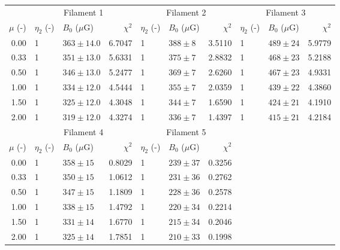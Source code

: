 \begin{tabular}{@{}rllr llr llr@{}}

\toprule
{} & \multicolumn{3}{c}{Filament 1}
   & \multicolumn{3}{c}{Filament 2}
   & \multicolumn{3}{c}{Filament 3} \\
\cmidrule(lr){2-4} \cmidrule(lr){5-7} \cmidrule(lr){8-10}
$\mu$ (-) & $\eta_2$ (-) & $B_0$ ($\mu$G) & $\chi^2$
          & $\eta_2$ (-) & $B_0$ ($\mu$G) & $\chi^2$
          & $\eta_2$ (-) & $B_0$ ($\mu$G) & $\chi^2$ \\

\midrule
0.00 & 1 & $363 \pm 14.0$ & 6.7047
     & 1 & $388 \pm 8$ & 3.5110
     & 1 & $489 \pm 24$ & 5.9779\\
0.33 & 1 & $351 \pm 13.0$ & 5.6331
     & 1 & $375 \pm 7$ & 2.8832
     & 1 & $468 \pm 23$ & 5.2188\\
0.50 & 1 & $346 \pm 13.0$ & 5.2477
     & 1 & $369 \pm 7$ & 2.6260
     & 1 & $467 \pm 23$ & 4.9331\\
1.00 & 1 & $334 \pm 12.0$ & 4.5444
     & 1 & $355 \pm 7$ & 2.0359
     & 1 & $439 \pm 22$ & 4.3860\\
1.50 & 1 & $325 \pm 12.0$ & 4.3048
     & 1 & $344 \pm 7$ & 1.6590
     & 1 & $424 \pm 21$ & 4.1910\\
2.00 & 1 & $319 \pm 12.0$ & 4.3274
     & 1 & $336 \pm 7$ & 1.4397
     & 1 & $415 \pm 21$ & 4.2184\\

\midrule
{} & \multicolumn{3}{c}{Filament 4}
   & \multicolumn{3}{c}{Filament 5} \\
\cmidrule(lr){2-4} \cmidrule(lr){5-7}
$\mu$ (-) & $\eta_2$ (-) & $B_0$ ($\mu$G) & $\chi^2$
          & $\eta_2$ (-) & $B_0$ ($\mu$G) & $\chi^2$ \\

\cmidrule(lr){1-7}
0.00 & 1 & $358 \pm 15$ & 0.8029
     & 1 & $239 \pm 37$ & 0.3256\\
0.33 & 1 & $350 \pm 15$ & 1.0612
     & 1 & $231 \pm 36$ & 0.2762\\
0.50 & 1 & $347 \pm 15$ & 1.1809
     & 1 & $228 \pm 36$ & 0.2578\\
1.00 & 1 & $338 \pm 15$ & 1.4792
     & 1 & $220 \pm 34$ & 0.2214\\
1.50 & 1 & $331 \pm 14$ & 1.6770
     & 1 & $215 \pm 34$ & 0.2046\\
2.00 & 1 & $325 \pm 14$ & 1.7851
     & 1 & $210 \pm 33$ & 0.1998\\

\bottomrule
\end{tabular} 
